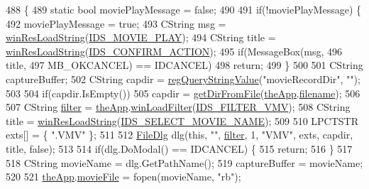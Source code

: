 \begin{DoxyCode}
488 \{
489   \textcolor{keyword}{static} \textcolor{keywordtype}{bool} moviePlayMessage = \textcolor{keyword}{false};
490 
491   \textcolor{keywordflow}{if}(!moviePlayMessage) \{
492     moviePlayMessage = \textcolor{keyword}{true};
493     CString msg = \mbox{\hyperlink{_win_res_util_8cpp_a416e85e80ab9b01376e87251c83d1a5a}{winResLoadString}}(\mbox{\hyperlink{resource_8h_a347c108b245364cf009841db26bf358c}{IDS\_MOVIE\_PLAY}});
494     CString title = \mbox{\hyperlink{_win_res_util_8cpp_a416e85e80ab9b01376e87251c83d1a5a}{winResLoadString}}(\mbox{\hyperlink{resource_8h_abc0b84029b8a14e65133a98d2b691eeb}{IDS\_CONFIRM\_ACTION}});
495     \textcolor{keywordflow}{if}(MessageBox(msg,
496                   title,
497                   MB\_OKCANCEL) == IDCANCEL)
498       \textcolor{keywordflow}{return};
499   \}
500 
501   CString captureBuffer;
502   CString capdir = \mbox{\hyperlink{_reg_8cpp_a618826d274df0d9c19fab2ff28bd9008}{regQueryStringValue}}(\textcolor{stringliteral}{"movieRecordDir"}, \textcolor{stringliteral}{""});
503   
504   \textcolor{keywordflow}{if}(capdir.IsEmpty())
505     capdir = \mbox{\hyperlink{class_main_wnd_a55c4858ec2c3f621790c9c7aec67011e}{getDirFromFile}}(\mbox{\hyperlink{_v_b_a_8cpp_a8095a9d06b37a7efe3723f3218ad8fb3}{theApp}}.\mbox{\hyperlink{class_v_b_a_a66eee6b61ec8bee20f21164cb0c37d2d}{filename}});
506 
507   CString \mbox{\hyperlink{_s_d_l_8cpp_af0122ee4312107103b580a98c74a4ea6}{filter}} = \mbox{\hyperlink{_v_b_a_8cpp_a8095a9d06b37a7efe3723f3218ad8fb3}{theApp}}.\mbox{\hyperlink{class_v_b_a_a228edf26b0dc4129658c174ee5a3c27c}{winLoadFilter}}(\mbox{\hyperlink{resource_8h_ac3105368cbd3360f30fb8d2c657b5c49}{IDS\_FILTER\_VMV}});
508   CString title = \mbox{\hyperlink{_win_res_util_8cpp_a416e85e80ab9b01376e87251c83d1a5a}{winResLoadString}}(\mbox{\hyperlink{resource_8h_aca81d4df4d65876990f3cda2b81d5a34}{IDS\_SELECT\_MOVIE\_NAME}});
509 
510   LPCTSTR exts[] = \{ \textcolor{stringliteral}{".VMV"} \};
511 
512   \mbox{\hyperlink{class_file_dlg}{FileDlg}} dlg(\textcolor{keyword}{this}, \textcolor{stringliteral}{""}, \mbox{\hyperlink{_s_d_l_8cpp_af0122ee4312107103b580a98c74a4ea6}{filter}}, 1, \textcolor{stringliteral}{"VMV"}, exts, capdir, title, \textcolor{keyword}{false});
513   
514   \textcolor{keywordflow}{if}(dlg.DoModal() == IDCANCEL) \{
515     \textcolor{keywordflow}{return};
516   \}
517 
518   CString movieName = dlg.GetPathName();
519   captureBuffer = movieName;
520   
521   \mbox{\hyperlink{_v_b_a_8cpp_a8095a9d06b37a7efe3723f3218ad8fb3}{theApp}}.\mbox{\hyperlink{class_v_b_a_abf9ac3c15536552d322f20a2dad1f519}{movieFile}} = fopen(movieName, \textcolor{stringliteral}{"rb"});

\end{DoxyCode}
